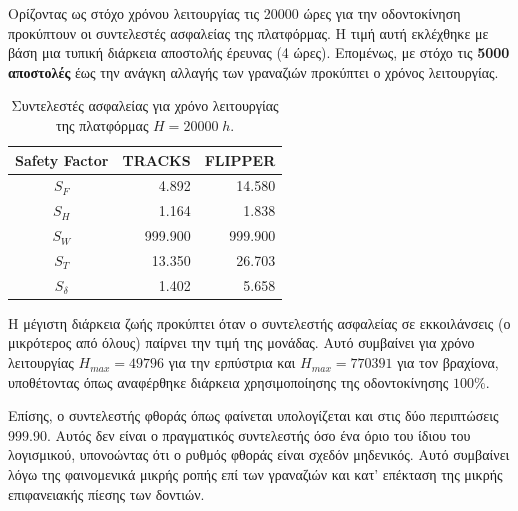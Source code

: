 Ορίζοντας ως στόχο χρόνου λειτουργίας τις 20000 ώρες για την οδοντοκίνηση προκύπτουν οι συντελεστές ασφαλείας της πλατφόρμας. Η τιμή αυτή εκλέχθηκε με βάση μια τυπική διάρκεια αποστολής έρευνας (4 ώρες). Επομένως, με στόχο τις \textbf{5000 αποστολές} έως την ανάγκη αλλαγής των γραναζιών προκύπτει ο χρόνος λειτουργίας.


\begin{table}[H]
    \centering
\begin{tabular}{|c|r|r|}
\hline
\rowcolor{Dandelion}
Safety Factor & TRACKS & FLIPPER \\
\hline
$S_F$ &  4.892 & 14.580\\ 
\hline
$S_H$ &  1.164 & 1.838\\ 
\hline
$S_W$  &  999.900 & 999.900\\ 
\hline
$S_T$  &  13.350 & 26.703\\ 
\hline
$S_\delta$  &  1.402 & 5.658\\ 
\hline

\end{tabular}

    \caption{Συντελεστές ασφαλείας για χρόνο λειτουργίας της πλατφόρμας $H = 20000\;h$.}
    \label{tab:sf}
\end{table}



Η μέγιστη διάρκεια ζωής προκύπτει όταν ο συντελεστής ασφαλείας σε εκκοιλάνσεις (ο μικρότερος από όλους) παίρνει την τιμή της μονάδας. Αυτό συμβαίνει για χρόνο λειτουργίας $H_{max} = 49796$ για την ερπύστρια και $H_{max} = 770391$ για τον βραχίονα, υποθέτοντας όπως αναφέρθηκε διάρκεια χρησιμοποίησης της οδοντοκίνησης $100\%$.

\par Επίσης, ο συντελεστής φθοράς όπως φαίνεται υπολογίζεται και στις δύο περιπτώσεις 999.90. Αυτός δεν είναι ο πραγματικός συντελεστής όσο ένα όριο του ίδιου του λογισμικού, υπονοώντας ότι ο ρυθμός φθοράς είναι σχεδόν μηδενικός. Αυτό συμβαίνει λόγω της φαινομενικά μικρής ροπής επί των γραναζιών και κατ' επέκταση της μικρής επιφανειακής πίεσης των δοντιών. 

